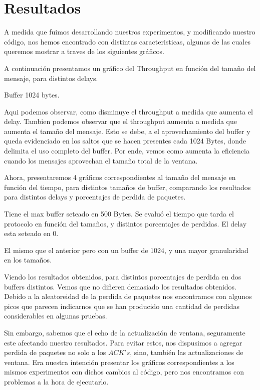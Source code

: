 \section{Resultados}


A medida que fuimos desarrollando nuestros experimentos, y modificando nuestro c\'odigo, nos hemos encontrado con distintas caracteristicas, algunas de las cuales queremos mostrar a traves de los siguientes gr\'aficos.

A continuaci\'on presentamos un gr\'afico del Throughput en funci\'on del tama\~no del mensaje, para distintos delays.

Buffer 1024 bytes.

Aqui podemos observar, como disminuye el throughput a medida que aumenta el delay. Tambien podemos observar que el throughput aumenta a medida que aumenta el tama\~no del mensaje. Esto se debe, a el aprovechamiento del buffer y queda evidenciado en los saltos que se hacen presentes cada 1024 Bytes, donde delimita el uso completo del buffer.
Por ende, vemos como aumenta la eficiencia cuando los mensajes aprovechan el tama\~no total de la ventana.


Ahora, presentaremos 4 gr\'aficos correspondientes al tama\~no del mensaje en funci\'on del tiempo, para distintos tama\~nos de buffer, comparando los resultados para distintos delays y porcentajes de perdida de paquetes.

Tiene el max buffer seteado en 500 Bytes. Se evalu\'o el tiempo que tarda el protocolo en funci\'on del tama\~nos, y distintos porcentajes de perdidas. El delay esta seteado en 0. 

El mismo que el anterior pero con un buffer de 1024, y una mayor granularidad en los tama\~nos.

Viendo los resultados obtenidos, para distintos porcentajes de perdida en dos buffers distintos. Vemos que no difieren demasiado los resultados obtenidos. Debido a la aleatoreidad de la perdida de paquetes nos encontramos con algunos picos que parecen indicarnos que se han producido una cantidad de perdidas considerables en algunas pruebas. 

Sin embargo, sabemos que el echo de la actualizaci\'on de ventana, seguramente este afectando nuestro resultados. Para evitar estos, nos dispusimos a agregar perdida de paquetes no solo a los $ACK's$, sino, tambi\'en las actualizaciones de ventana.
Era nuestra intenci\'on presentar los gr\'aficos correspondientes a los mismos experimentos con dichos cambios al c\'odigo, pero nos encontramos con problemas a la hora de ejecutarlo.



